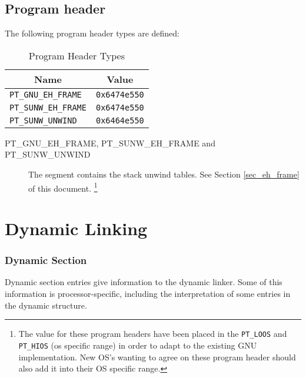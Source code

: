 
\subsection{Program header}

The following \xARCH program header types are defined:

\begin{table}[H]
\Hrule
  \caption{Program Header Types}
  \begin{center}
    \begin{tabular}[t]{l|l}
      \multicolumn{1}{c}{Name} & \multicolumn{1}{c}{Value} \\
      \hline
      \texttt{PT_GNU_EH_FRAME} & \texttt{0x6474e550} \\
      \texttt{PT_SUNW_EH_FRAME} & \texttt{0x6474e550} \\
      \texttt{PT_SUNW_UNWIND} & \texttt{0x6464e550}
    \end{tabular}
  \end{center}
\Hrule
\end{table}

\begin{description}
 \item[PT_GNU_EH_FRAME, PT_SUNW_EH_FRAME and PT_SUNW_UNWIND]
      The segment contains the stack unwind tables.
      See Section \ref{sec_eh_frame} of this document.
      \footnote{
	The value for these program headers have been placed in the
	{\tt PT_LOOS} and {\tt PT_HIOS} (os specific range) in order to adapt
	to the existing GNU implementation.  New OS's wanting to
	agree on these program header should also add it into
	their OS specific range.
      }
\end{description}

\section{Dynamic Linking}

\subsubsection{Dynamic Section}

Dynamic section entries give information to the dynamic linker. Some
of this information is processor-specific, including the interpretation
of some entries in the dynamic structure.

